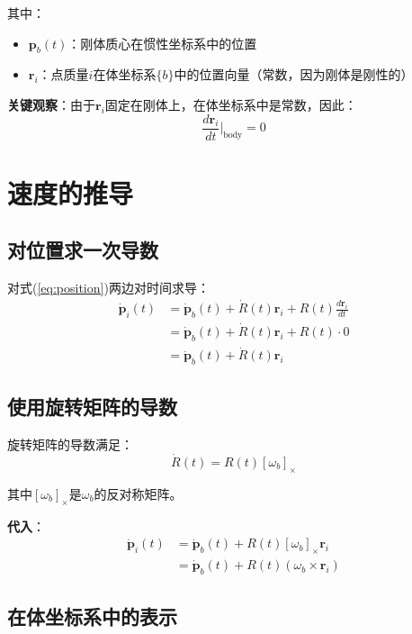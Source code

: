 \documentclass[12pt,a4paper]{article}
\begin{document}
其中：
\begin{itemize}
\item $\bm{p}_b(t)$：刚体质心在惯性坐标系中的位置
\item $\bm{r}_i$：点质量$i$在体坐标系$\{b\}$中的位置向量（常数，因为刚体是刚性的）
\end{itemize}

\textbf{关键观察}：由于$\bm{r}_i$固定在刚体上，在体坐标系中是常数，因此：
\begin{equation}
\frac{d\bm{r}_i}{dt}\Big|_{\text{body}} = 0
\end{equation}

\section{速度的推导}

\subsection{对位置求一次导数}

对式(\ref{eq:position})两边对时间求导：
\begin{align}
\dot{\bm{p}}_i(t) &= \dot{\bm{p}}_b(t) + \dot{R}(t) \bm{r}_i + R(t) \frac{d\bm{r}_i}{dt} \\
&= \dot{\bm{p}}_b(t) + \dot{R}(t) \bm{r}_i + R(t) \cdot 0 \\
&= \dot{\bm{p}}_b(t) + \dot{R}(t) \bm{r}_i
\label{eq:velocity}
\end{align}

\subsection{使用旋转矩阵的导数}

旋转矩阵的导数满足：
\begin{equation}
\dot{R}(t) = R(t) [\omega_b]_{\times}
\label{eq:rotation_derivative}
\end{equation}

其中$[\omega_b]_{\times}$是$\omega_b$的反对称矩阵。

\textbf{代入}：
\begin{align}
\dot{\bm{p}}_i(t) &= \dot{\bm{p}}_b(t) + R(t) [\omega_b]_{\times} \bm{r}_i \\
&= \dot{\bm{p}}_b(t) + R(t) (\omega_b \times \bm{r}_i)
\label{eq:velocity_expanded}
\end{align}

\subsection{在体坐标系中的表示}
\end{document}
